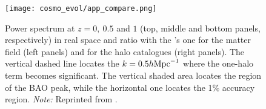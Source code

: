 \begin{figure}[ht]
    \centering
    \texttt{[image: cosmo\_evol/app\_compare.png]}
    \caption{Power spectrum at $z = 0,\ 0.5$ and $1$ (top, middle and bottom panels, respectively) in real space and ratio with the \nbody’s one for the matter field (left panels) and for the halo catalogues (right panels). The vertical dashed line locates the $k = 0.5h\text{Mpc}^{-1}$ where the one-halo term becomes significant. The vertical shaded area locates the region of the BAO peak, while the horizontal one locates the 1\% accuracy region.  \textit{Note:} Reprinted from \textcite{2017JCAP...07..050M}.}
    \label{fig:app_compare}
\end{figure}



